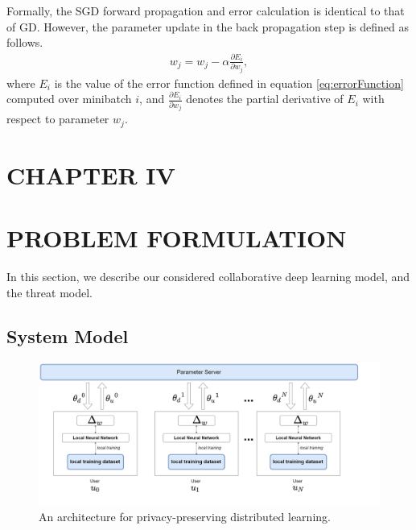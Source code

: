 \documentclass[letterpaper]{article}
\begin{document}
\begin{flushleft}
{%
Formally, the SGD forward propagation and error calculation is identical to that of GD. However, the parameter update in the 
back propagation step is defined as follows.
\begin{align}\label{eq:SGD}
w_j = w_j -\alpha \frac{\partial E_i}{\partial w_j}, 
\end{align}
where $E_i$ is the value of the error function defined in equation \eqref{eq:errorFunction} computed over
minibatch $i$, and  $\frac{\partial E_i}{\partial w_j}$ denotes the partial derivative of $E_i$ with respect to parameter $w_j$. 

\pagebreak
\section*{CHAPTER IV}
\vspace{0.25in}
\section{PROBLEM FORMULATION}

In this section, we describe our considered collaborative deep learning model, and the threat model. 

\subsection{System Model} \label{sec:systemModel}

\begin{figure}[H]
  \centering
    \includegraphics[width=7in]{HighLevelArch.png}
    \caption[Privacy preserving architecture]{\label{fig:HighLevel} An architecture for privacy-preserving distributed learning.}
  \end{figure}

}
\end{flushleft}
\end{document}
